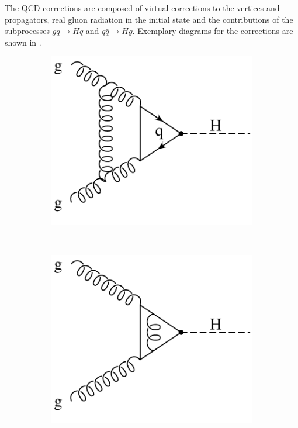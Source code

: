 The QCD corrections are composed of virtual corrections to the vertices and propagators, real gluon radiation in the initial state and the contributions of the subprocesses $gq \rightarrow Hq$ and $q \bar q \rightarrow Hg$.
Exemplary diagrams for the corrections are shown in .

%
\begin{figure}
\centering
\begin{subfigure}[]{0.3\textwidth}
	\includegraphics[width=\textwidth]{images/gluonfusion_virtual1.pdf}
	\caption{}
\end{subfigure}
~
\begin{subfigure}[]{0.3\textwidth}
	\includegraphics[width=\textwidth]{images/gluonfusion_virtual2.pdf}

\end{subfigure}
\end{figure}
